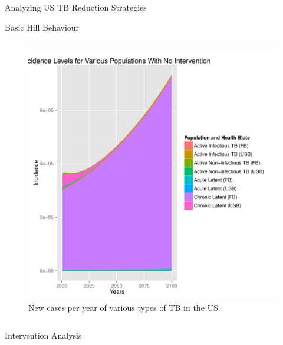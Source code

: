 \documentclass[final]{beamer}
\begin{document}
\begin{frame}
\begin{columns}
\begin{column}{.3\textwidth}
\begin{block}{Analyzing US TB Reduction Strategies}
\begin{block}{Basic Hill Behaviour}
\begin{column}{.45\textwidth}
            \begin{figure}[h]
              \begin{center}
                \includegraphics[scale=1]{incPlotTotal}
              \end{center}
              \caption{New cases per year of various types of TB in the US.}
              \label{fig:incPlotTotal}
            \end{figure}
          \end{column}
        \end{block}
        \begin{block}{Intervention Analysis}
          \begin{column}{.45\textwidth}
            \begin{figure}[h]
              \begin{center}

\end{center}
\end{figure}
\end{column}
\end{block}
\end{block}
\end{column}
\end{columns}
\end{frame}
\end{document}
